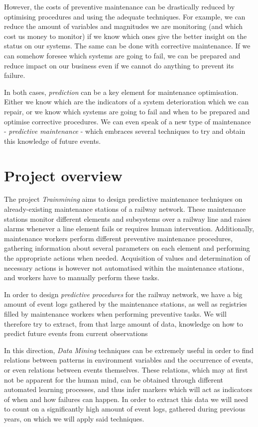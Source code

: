 \documentclass[a4paper,12pt]{article}
\begin{document}
However, the costs of preventive maintenance can be drastically reduced by optimising procedures and using the adequate techniques. For example, we can reduce the amount of variables and magnitudes we are monitoring (and which cost us money to monitor) if we know which ones give the better insight on the status on our systems. The same can be done with corrective maintenance. If we can somehow foresee which systems are going to fail, we can be prepared and reduce impact on our business even if we cannot do anything to prevent its failure.

In both cases, \emph{prediction} can be a key element for maintenance optimisation. Either we know which are the indicators of a system deterioration which we can repair, or we know which systems are going to fail and when to be prepared and optimise corrective procedures. We can even speak of a new type of maintenance - \emph{predictive maintenance} - which embraces several techniques to try and obtain this knowledge of future events.

\section{Project overview}
The project \emph{Trainmining} aims to design predictive maintenance techniques on already-existing maintenance stations of a railway network. These maintenance stations monitor different elements and subsystems over a railway line and raises alarms whenever a line element fails or requires human intervention. Additionally, maintenance workers perform different preventive maintenance procedures, gathering information about several parameters on each element and performing the appropriate actions when needed. Acquisition of values and determination of necessary actions is however not automatised within the maintenance stations, and workers have to manually perform these tasks.

In order to design \emph{predictive procedures} for the railway network, we have a big amount of event logs gathered by the maintenance stations, as well as registries filled by maintenance workers when performing preventive tasks. We will therefore try to extract, from that large amount of data, knowledge on how to predict future events from current observations

In this direction, \emph{Data Mining} techniques can be extremely useful in order to find relations between patterns in environment variables and the occurrence of events, or even relations between events themselves. These relations, which may at first not be apparent for the human mind, can be obtained through different automated learning processes, and thus infer markers which will act as indicators of when and how failures can happen. In order to extract this data we will need to count on a significantly high amount of event logs, gathered during previous years, on which we will apply said techniques.
\end{document}
